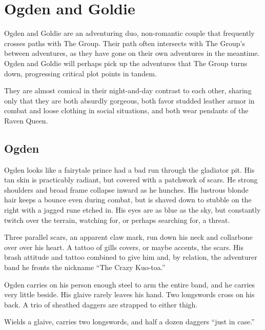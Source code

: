 \section{Ogden and Goldie}\label{sec:ogdenAndGoldie}

Ogden and Goldie are an adventuring duo, non-romantic couple that frequently crosses paths with
The Group.
Their path often intersects with The Group's between adventures, as they have gone on their own
adventures in the meantime.
Ogden and Goldie will perhaps pick up the adventures that The Group turns down, progressing
critical plot points in tandem.

They are almost comical in their night-and-day contrast to each other, sharing only that they are
both absurdly gorgeous, both favor studded leather armor in combat and loose clothing in social
situations, and both wear pendants of the Raven Queen.

\subsection{Ogden}\label{subsec:ogden}

  \begin{aloud}
  \label{description:ogden}
  Ogden looks like a fairytale prince had a bad run through the gladiator pit.
  His tan skin is practicably radiant, but covered with a patchwork of scars.
  He strong shoulders and broad frame collapse inward as he hunches.
  His lustrous blonde hair keeps a bounce even during combat, but is shaved down to stubble on
    the right with a jagged rune etched in.
  His eyes are as blue as the sky, but constantly twitch over the terrain, watching for, or perhaps
    searching for, a threat.

  Three parallel scars, an apparent claw mark, run down his neck and collarbone over over his heart.
  A tattoo of gills covers, or maybe accents, the scars.
  His brash attitude and tattoo combined to give him and, by relation,
    the adventurer band he fronts the nickname ``The Crazy Kuo-toa.''

  Ogden carries on his person enough steel to arm the entire band,
    and he carries very little beside.
  His glaive rarely leaves his hand.
  Two longswords cross on his back.
  A trio of sheathed daggers are strapped to either thigh.
  \end{aloud}

Wields a glaive, carries two longswords, and half a dozen daggers ``just in case.''

